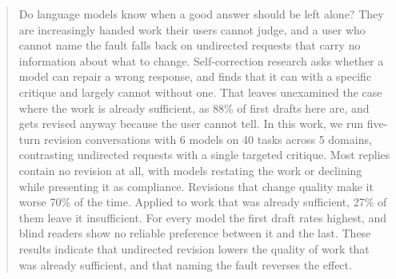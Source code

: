 \begin{abstract}
Do language models know when a good answer should be left alone? They are increasingly
handed work their users cannot judge, and a user who cannot name the fault falls back on
undirected requests that carry no information about what to change. Self-correction research
asks whether a model can repair a wrong response, and finds that it can with a specific
critique and largely cannot without one. That leaves unexamined the case where the work is
already sufficient, as 88\% of first drafts here are, and gets revised anyway because the
user cannot tell. In this work, we run five-turn revision conversations with 6 models on 40
tasks across 5 domains, contrasting undirected requests with a single targeted critique.
Most replies contain no revision at all, with models restating the work or declining while
presenting it as compliance. Revisions that change quality make it worse 70\% of the time.
Applied to work that was already sufficient, 27\% of them leave it insufficient. For every
model the first draft rates highest, and blind readers show no reliable preference between
it and the last. These results indicate that undirected revision lowers the quality of work
that was already sufficient, and that naming the fault reverses the effect.
\end{abstract}
